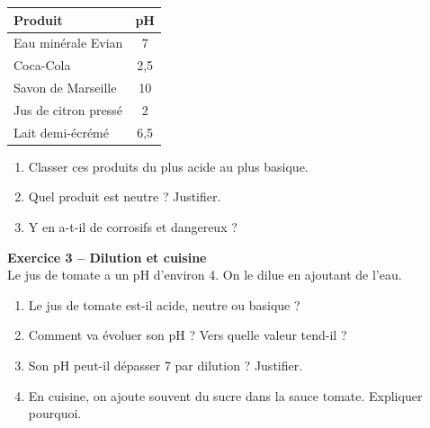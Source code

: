 \documentclass[11pt,a4paper]{article}
\renewcommand{\arraystretch}{1.6}
\begin{document}
\noindent%
\begin{minipage}{0.32\linewidth}%
{\renewcommand{\arraystretch}{1.4}
\begin{tabular}{|l|c|}
\hline
\textbf{Produit} & \textbf{pH} \\
\hline
Eau minérale Evian & 7 \\
\hline
Coca-Cola & 2,5 \\
\hline
Savon de Marseille & 10 \\
\hline
Jus de citron pressé & 2 \\
\hline
Lait demi-écrémé & 6,5 \\
\hline
\end{tabular}}
\end{minipage}%
\hfill%
\begin{minipage}{0.63\linewidth}%
\begin{enumerate}[label=\textbf{\arabic*.}]
\item Classer ces produits du plus acide au plus basique.

\vspace{5mm}
\dotfill

\item Quel produit est neutre ? Justifier.

\vspace{5mm}
\dotfill

\item Y en a-t-il de corrosifs et dangereux ?

\vspace{5mm}
\dotfill
\end{enumerate}
\end{minipage}

\vspace{3mm}

\textbf{Exercice 3 -- Dilution et cuisine} \\[1mm]

Le jus de tomate a un pH d'environ 4. On le dilue en ajoutant de l'eau.

\begin{enumerate}[label=\textbf{\arabic*.}]
\item Le jus de tomate est-il acide, neutre ou basique ?

\vspace{5mm}
\dotfill

\item Comment va évoluer son pH ? Vers quelle valeur tend-il ?

\vspace{5mm}
\dotfill

\item Son pH peut-il dépasser 7 par dilution ? Justifier.

\vspace{5mm}
\dotfill

\item En cuisine, on ajoute souvent du sucre dans la sauce tomate. Expliquer pourquoi.

\vspace{5mm}
\dotfill

\vspace{5mm}

\dotfill
\end{enumerate}
\end{document}

